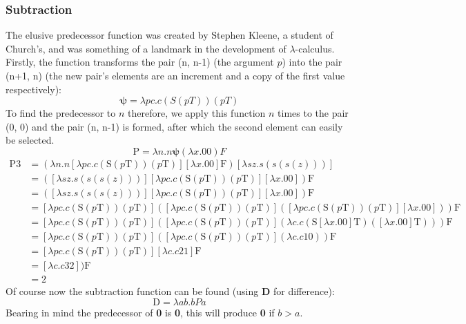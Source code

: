 \documentclass {article}
\begin{document}
\subsubsection{Subtraction}

The elusive predecessor function was created by Stephen Kleene, a student of Church's, and was something of a landmark in the development of $\lambda$-calculus.
Firstly, the function transforms the pair (n, n-1) (the argument $p$) into the pair (n+1, n) (the new pair's elements are an increment and a copy of the first value respectively):
\begin{equation*}
\bm{\psi} = \lambda pc.c(S(pT))(pT)
\end{equation*}
To find the predecessor to $n$ therefore, we apply this function $n$ times to the pair (0, 0) and the pair (n, n-1) is formed, after which the second element can easily be selected.
\begin{equation*}
\bm{\mathrm{P}} = \lambda n.n \bm{\psi} (\lambda x.00) F 
\end{equation*}
\begin{equation*}
\begin{aligned}
\bm{\mathrm{P3}} &= (\lambda n.n [\lambda pc.c(\bm{\mathrm{S}}(p\bm{\mathrm{T}}))(p\bm{\mathrm{T}})] [\lambda x.\bm{\mathrm{00}}] \bm{\mathrm{F}}) [\lambda sz.s(s(s(z)))]\\
&= ([\lambda sz.s(s(s(z)))] [\lambda pc.c(\bm{\mathrm{S}}(p\bm{\mathrm{T}}))(p\bm{\mathrm{T}})] [\lambda x.\bm{\mathrm{00}}]) \bm{\mathrm{F}}\\
&= ([\lambda sz.s(s(s(z)))] [\lambda pc.c(\bm{\mathrm{S}}(p\bm{\mathrm{T}}))(p\bm{\mathrm{T}})] [\lambda x.\bm{\mathrm{00}}]) \bm{\mathrm{F}}\\
&= [\lambda pc.c(\bm{\mathrm{S}}(p\bm{\mathrm{T}}))(p\bm{\mathrm{T}})]([\lambda pc.c(\bm{\mathrm{S}}(p\bm{\mathrm{T}}))(p\bm{\mathrm{T}})]([\lambda pc.c(\bm{\mathrm{S}}(p\bm{\mathrm{T}}))(p\bm{\mathrm{T}})][\lambda x.\bm{\mathrm{00}}]))\bm{\mathrm{F}}\\
&= [\lambda pc.c(\bm{\mathrm{S}}(p\bm{\mathrm{T}}))(p\bm{\mathrm{T}})]([\lambda pc.c(\bm{\mathrm{S}}(p\bm{\mathrm{T}}))(p\bm{\mathrm{T}})](\lambda c.c(\bm{\mathrm{S}}[\lambda x.\bm{\mathrm{00}}]\bm{\mathrm{T}})([\lambda x.\bm{\mathrm{00}}]\bm{\mathrm{T}})))\bm{\mathrm{F}}\\
&= [\lambda pc.c(\bm{\mathrm{S}}(p\bm{\mathrm{T}}))(p\bm{\mathrm{T}})]([\lambda pc.c(\bm{\mathrm{S}}(p\bm{\mathrm{T}}))(p\bm{\mathrm{T}})](\lambda c.c\bm{\mathrm{10}}))\bm{\mathrm{F}}\\
&= [\lambda pc.c(\bm{\mathrm{S}}(p\bm{\mathrm{T}}))(p\bm{\mathrm{T}})][\lambda c.c\bm{\mathrm{21}}]\bm{\mathrm{F}}\\
&= [\lambda c.c\bm{\mathrm{32}} ])\bm{\mathrm{F}}\\
&= \bm{\mathrm{2}}
\end{aligned}
\end{equation*}
Of course now the subtraction function can be found (using \textbf{D} for difference):
\begin{equation*}
\bm{\mathrm{D}} = \lambda ab.bPa
\end{equation*}
Bearing in mind the predecessor of \textbf{0} is \textbf{0}, this will produce \textbf{0} if $b>a$.
\end{document}
